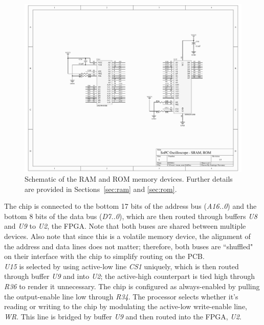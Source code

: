 \documentclass[titlepage]{scrartcl}
\begin{document}
	\begin{figure}[h!]
	\vspace{-2cm}
	\centerline{\includegraphics[width=26cm, angle=90, origin=c]{img/sram_rom.pdf}}
                	\caption{Schematic of the RAM and ROM memory devices. Further details are provided in Sections~\ref{sec:ram} and \ref{sec:rom}.}
               	\label{fig:ram_rom}
	\end{figure}

	The chip is connected to the bottom 17 bits of the address bus (\textit{A16..0}) and the bottom 8 bits of the data bus (\textit{D7..0}), which are then routed through buffers \textit{U8} and \textit{U9} to \textit{U2}, the FPGA. Note that both buses are shared between multiple devices. Also note that since this is a volatile memory device, the alignment of the address and data lines does not matter; therefore, both buses are ``shuffled" on their interface with the chip to simplify routing on the PCB.\\

	\textit{U15} is selected by using active-low line \textit{CS1} uniquely, which is then routed through buffer \textit{U9} and into \textit{U2}; the active-high counterpart is tied high through \textit{R36} to render it unnecessary. The chip is configured as always-enabled by pulling the output-enable line low through \textit{R34}. The processor selects whether it's reading or writing to the chip by modulating the active-low write-enable line, \textit{WR}. This line is bridged by buffer \textit{U9} and then routed into the FPGA, \textit{U2}.\\
\end{document}
